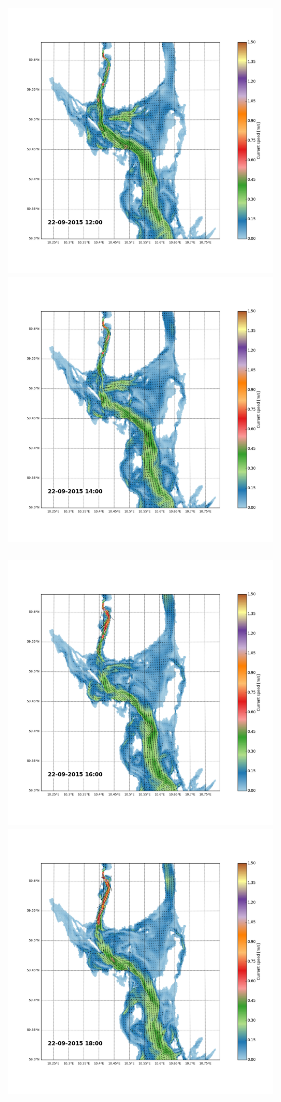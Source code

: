 \documentclass[12pt,a4paper,english]{article}
\begin{document}
\begin{figure}[h]
\centerline{
\includegraphics*[trim=2.0cm 3cm 6.0cm 3.5cm,clip=true,height=7cm]{Python/stromfelt_34}
\includegraphics*[trim=3.7cm 3cm 1.3cm 3.5cm,clip=true,height=7cm]{Python/stromfelt_36}
}
\centerline{
\includegraphics*[trim=2.0cm 3cm 6.0cm 3.5cm,clip=true,height=7cm]{Python/stromfelt_38}
\includegraphics*[trim=3.7cm 3cm 1.3cm 3.5cm,clip=true,height=7cm]{Python/stromfelt_40}
}
\end{figure}
\end{document}
